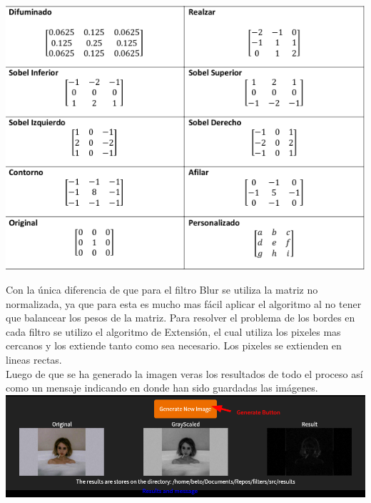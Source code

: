 \documentclass[12pt]{article}
\begin{document}
\includegraphics[width=\textwidth]{kernels}

Con la única diferencia de que para el filtro Blur se utiliza la matriz no normalizada, ya que para esta es mucho
 mas fácil aplicar el algoritmo al no tener que balancear los pesos de la matriz. Para resolver el problema de los
 bordes en cada filtro se utilizo el algoritmo de Extensión, el cual utiliza los pixeles mas cercanos y los
 extiende tanto como sea necesario. Los pixeles se extienden en lineas rectas. \\

Luego de que se ha generado la imagen veras los resultados de todo el proceso así como un mensaje indicando en donde
 han sido guardadas las imágenes. \\


\includegraphics[width=\textwidth]{results}

\newpage
\nocite{*}
\printbibliography
\end{document}
